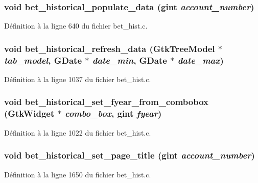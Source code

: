 \subsubsection[{bet\_\-historical\_\-populate\_\-data}]{\setlength{\rightskip}{0pt plus 5cm}void bet\_\-historical\_\-populate\_\-data (gint {\em account\_\-number})}\label{bet__hist_8h_adc9c988a689a8786009b652946cafd79}


Définition à la ligne 640 du fichier bet\_\-hist.c.

\subsubsection[{bet\_\-historical\_\-refresh\_\-data}]{\setlength{\rightskip}{0pt plus 5cm}void bet\_\-historical\_\-refresh\_\-data (GtkTreeModel $\ast$ {\em tab\_\-model}, \/  GDate $\ast$ {\em date\_\-min}, \/  GDate $\ast$ {\em date\_\-max})}\label{bet__hist_8h_a91d084d5b8b5d19d52294b1148c758b9}


Définition à la ligne 1037 du fichier bet\_\-hist.c.

\subsubsection[{bet\_\-historical\_\-set\_\-fyear\_\-from\_\-combobox}]{\setlength{\rightskip}{0pt plus 5cm}void bet\_\-historical\_\-set\_\-fyear\_\-from\_\-combobox (GtkWidget $\ast$ {\em combo\_\-box}, \/  gint {\em fyear})}\label{bet__hist_8h_ae25049d7e4dc6d068bafe7eef985e0db}


Définition à la ligne 1022 du fichier bet\_\-hist.c.

\subsubsection[{bet\_\-historical\_\-set\_\-page\_\-title}]{\setlength{\rightskip}{0pt plus 5cm}void bet\_\-historical\_\-set\_\-page\_\-title (gint {\em account\_\-number})}\label{bet__hist_8h_aa39deaae836fcf9b62acc430d95e1479}


Définition à la ligne 1650 du fichier bet\_\-hist.c.

